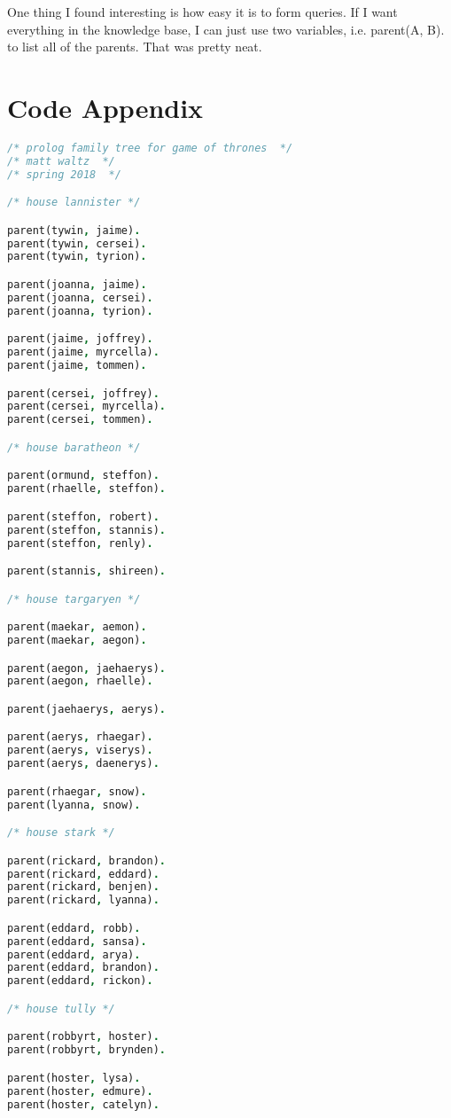\documentclass[11pt,letterpaper]{article}
\begin{document}
One thing I found interesting is how easy it is to form queries. If I want everything in the knowledge base, I can just use two variables, i.e. parent(A, B). to list all of the parents. That was pretty neat.

\section{Code Appendix}
\begin{lstlisting}[language=Prolog]
/* prolog family tree for game of thrones  */
/* matt waltz  */
/* spring 2018  */

/* house lannister */

parent(tywin, jaime).
parent(tywin, cersei).
parent(tywin, tyrion).

parent(joanna, jaime).
parent(joanna, cersei).
parent(joanna, tyrion).

parent(jaime, joffrey).
parent(jaime, myrcella).
parent(jaime, tommen).

parent(cersei, joffrey).
parent(cersei, myrcella).
parent(cersei, tommen).

/* house baratheon */

parent(ormund, steffon).
parent(rhaelle, steffon).

parent(steffon, robert).
parent(steffon, stannis).
parent(steffon, renly).

parent(stannis, shireen).

/* house targaryen */

parent(maekar, aemon).
parent(maekar, aegon).

parent(aegon, jaehaerys).
parent(aegon, rhaelle).

parent(jaehaerys, aerys).

parent(aerys, rhaegar).
parent(aerys, viserys).
parent(aerys, daenerys).

parent(rhaegar, snow).
parent(lyanna, snow).

/* house stark */

parent(rickard, brandon).
parent(rickard, eddard).
parent(rickard, benjen).
parent(rickard, lyanna).

parent(eddard, robb).
parent(eddard, sansa).
parent(eddard, arya).
parent(eddard, brandon).
parent(eddard, rickon).

/* house tully */

parent(robbyrt, hoster).
parent(robbyrt, brynden).

parent(hoster, lysa).
parent(hoster, edmure).
parent(hoster, catelyn).


\end{lstlisting}
\end{document}
